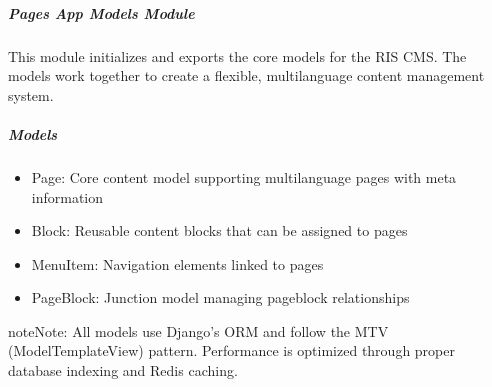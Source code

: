 \documentclass[letterpaper,10pt,english]{sphinxmanual}
\begin{document}
\subparagraph{Pages App Models Module}
\label{\detokenize{pages_app.models:pages-app-models-module}}
\sphinxAtStartPar
This module initializes and exports the core models for the RIS CMS.
The models work together to create a flexible, multi\sphinxhyphen{}language content management system.


\subparagraph{Models}
\label{\detokenize{pages_app.models:models}}\begin{itemize}
\item {} 
\sphinxAtStartPar
Page: Core content model supporting multi\sphinxhyphen{}language pages with meta information

\item {} 
\sphinxAtStartPar
Block: Reusable content blocks that can be assigned to pages

\item {} 
\sphinxAtStartPar
MenuItem: Navigation elements linked to pages

\item {} 
\sphinxAtStartPar
PageBlock: Junction model managing page\sphinxhyphen{}block relationships

\end{itemize}

\begin{sphinxadmonition}{note}{Note:}
\sphinxAtStartPar
All models use Django’s ORM and follow the MTV (Model\sphinxhyphen{}Template\sphinxhyphen{}View) pattern.
Performance is optimized through proper database indexing and Redis caching.
\end{sphinxadmonition}
\end{document}
